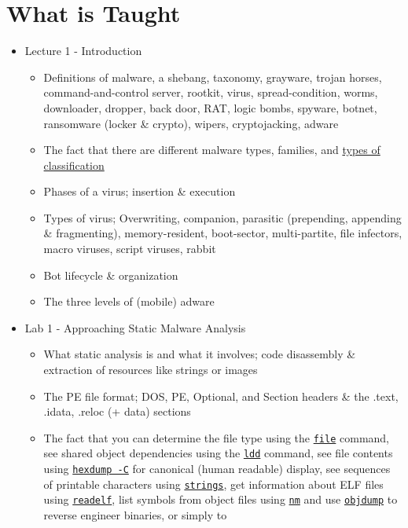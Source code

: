 \documentclass[]{project_plan}
\begin{document}
\chapter{What is Taught}
\begin{itemize}
  \item Lecture 1 - Introduction
        \begin{itemize}
          \item Definitions of malware, a shebang, taxonomy, grayware, trojan horses,
                command-and-control server, rootkit, virus, spread-condition, worms, downloader, dropper, back door, RAT,
                logic bombs, spyware, botnet, ransomware (locker \& crypto), wipers, cryptojacking, adware
          \item The fact that there are different malware types, families, and \underline{types of classification}
          \item Phases of a virus; insertion \& execution
          \item Types of virus; Overwriting, companion, parasitic (prepending, appending \& fragmenting),
                memory-resident, boot-sector, multi-partite, file infectors, macro viruses, script viruses, rabbit
          \item Bot lifecycle \& organization
          \item The three levels of (mobile) adware
        \end{itemize}
  \item Lab 1 - Approaching Static Malware Analysis
        \begin{itemize}
          \item What static analysis is and what it involves; code disassembly \&
                extraction of resources like strings or images
          \item The PE file format; DOS, PE, Optional, and Section headers \& the .text, .idata, .reloc (+ data) sections
          \item The fact that you can determine the file type using the \underline{\lstinline|file|} command,
                see shared object dependencies using the \underline{\lstinline|ldd|} command, see file contents using
                \underline{\lstinline|hexdump -C|} for canonical (human readable) display, see sequences
                of printable characters using \underline{\lstinline|strings|}, get information about ELF files using \underline{\lstinline|readelf|},
                list symbols from object files using \underline{\lstinline|nm|} and use \underline{\lstinline|objdump|} to reverse engineer binaries, or simply to

\end{itemize}
\end{itemize}
\end{document}

